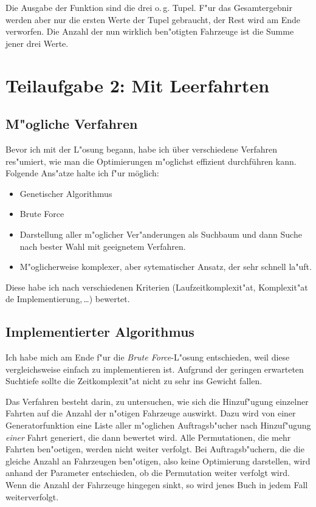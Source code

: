 \documentclass{scrreprt}
\begin{document}
Die Ausgabe der Funktion sind die drei o.\,g. Tupel. F"ur das Gesamtergebnir
werden aber nur die ersten Werte der Tupel gebraucht, der Rest wird am Ende
verworfen. Die Anzahl der nun wirklich ben"otigten Fahrzeuge ist die Summe jener
drei Werte.

\chapter{Teilaufgabe 2: Mit Leerfahrten}

\section{M"ogliche Verfahren}
Bevor ich mit der L"osung begann, habe ich über verschiedene Verfahren
res"umiert, wie man die Optimierungen m"oglichst effizient durchführen kann.
Folgende Ans"atze halte ich f"ur möglich:

\begin{itemize}
\item Genetischer Algorithmus
\item Brute Force
\item Darstellung aller m"oglicher Ver"anderungen als Suchbaum und dann Suche
nach bester Wahl mit geeignetem Verfahren.
\item M"oglicherweise komplexer, aber sytematischer Ansatz, der sehr schnell
la"uft.
\end{itemize}
Diese habe ich nach verschiedenen Kriterien (Laufzeitkomplexit"at, Komplexit"at
de Implementierung,\,\dots ) bewertet.

\section{Implementierter Algorithmus}
Ich habe mich am Ende f"ur die \emph{Brute Force}-L"osung entschieden, weil
diese vergleichsweise einfach zu implementieren ist.  Aufgrund der geringen 
erwarteten Suchtiefe sollte die Zeitkomplexit"at nicht zu sehr ins Gewicht
fallen.

Das Verfahren besteht darin, zu untersuchen, wie sich die Hinzuf"ugung einzelner
Fahrten auf die Anzahl der n"otigen Fahrzeuge auswirkt.  Dazu wird von einer
Generatorfunktion eine Liste aller m"oglichen Auftragsb"ucher nach Hinzuf"ugung
\emph{einer} Fahrt generiert, die dann bewertet wird.  Alle Permutationen, die
mehr Fahrten ben"oetigen, werden nicht weiter verfolgt.  Bei Auftragsb"uchern,
die die gleiche Anzahl an Fahrzeugen ben"otigen, also keine Optimierung
darstellen, wird anhand der Parameter entschieden, ob die Permutation weiter
verfolgt wird.  Wenn die Anzahl der Fahrzeuge hingegen sinkt, so wird jenes Buch
in jedem Fall weiterverfolgt.
\end{document}
